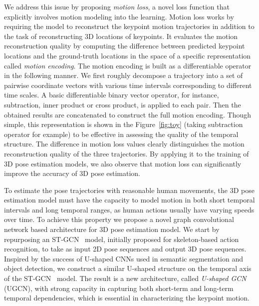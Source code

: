 \documentclass[runningheads]{llncs}
\begin{document}
We address this issue by proposing \emph{motion loss}, a novel loss function that explicitly involves motion modeling into the learning.
Motion loss works by requiring the model to reconstruct the keypoint motion trajectories in addition to the task of reconstructing 3D locations of keypoints.
It evaluates the motion reconstruction quality by computing the difference between predicted keypoint locations and the ground-truth locations in the space of a specific representation called \emph{motion encoding}.
The motion encoding is built as a differentiable operator in the following manner.
We first roughly decompose a trajectory into a set of pairwise coordinate vectors with various time intervals corresponding to different time scales.
A basic differentiable binary vector operator, for instance, subtraction, inner product or cross product, is applied to each pair.
Then the obtained results are concatenated to construct the full motion encoding.
Though simple, this representation is shown in the Figure~\ref{fig:toy} (taking subtraction operator for example)
to be effective in assessing the quality of the temporal structure.
The difference in motion loss values clearly distinguishes the motion reconstruction quality of the three trajectories.
By applying it to the training of 3D pose estimation models, we also observe that motion loss can significantly improve the accuracy of 3D pose estimation.

To estimate the pose trajectories with reasonable human movements,
the 3D pose estimation model must have the capacity to model motion in both short temporal intervals and long temporal ranges,
as human actions usually have varying speeds over time.
To achieve this property we propose a novel graph convolutional network based architecture for 3D pose estimation model.
We start by repurposing an ST-GCN~\cite{yan2018spatial} model, initially proposed for skeleton-based action recognition,
to take as input 2D pose sequences and output 3D pose sequences.
Inspired by the success of U-shaped CNNs used in semantic segmentation and object detection,
we construct a similar U-shaped structure on the temporal axis of the ST-GCN~\cite{yan2018spatial} model.
The result is a new architecture, called \emph{U-shaped GCN} (UGCN),
with strong capacity in capturing both short-term and long-term temporal dependencies,
which is essential in characterizing the keypoint motion.
\end{document}
